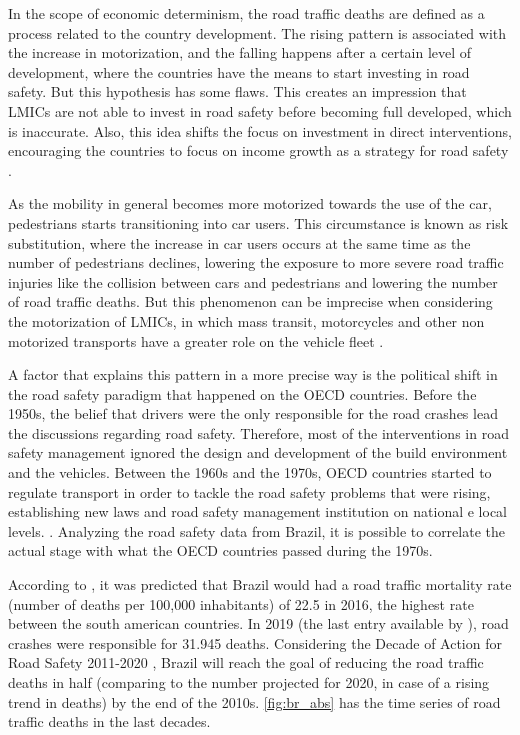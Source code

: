 In the scope of economic determinism, the road traffic deaths are defined as a process related to the country development. The rising pattern is associated with the increase in motorization, and the falling happens after a certain level of development, where the countries have the means to start investing in road safety. But this hypothesis has some flaws. This creates an impression that LMICs are not able to invest in road safety before becoming full developed, which is inaccurate. Also, this idea shifts the focus on investment in direct interventions, encouraging the countries to focus on income growth as a strategy for road safety \cite{Bhalla2016}.

As the mobility in general becomes more motorized towards the use of the car, pedestrians starts transitioning into car users. This circumstance is known as risk substitution, where the increase in car users occurs at the same time as the number of pedestrians declines, lowering the exposure to more severe road traffic injuries like the collision between cars and pedestrians and lowering the number of road traffic deaths. But this phenomenon can be imprecise when considering the motorization of LMICs, in which mass transit, motorcycles and other non motorized transports have a greater role on the vehicle fleet \cite{Bhalla2016}.   

A factor that explains this pattern in a more precise way is the political shift in the road safety paradigm that happened on the OECD countries. Before the 1950s, the belief that drivers were the only responsible for the road crashes lead the discussions regarding road safety. Therefore, most of the interventions in road safety management ignored the design and development of the build environment and the vehicles. Between the 1960s and the 1970s, OECD countries started to regulate transport in order to tackle the road safety problems that were rising, establishing new laws and road safety management institution on national e local levels. \cite{Bhalla2016}. Analyzing the road safety data from Brazil, it is possible to correlate the actual stage with what the OECD countries passed during the 1970s.

According to \textcite{WHO2018}, it was predicted that Brazil would had a road traffic mortality rate (number of deaths per 100,000 inhabitants) of 22.5 in 2016, the highest rate between the south american countries. In 2019 (the last entry available by \textcite{MinistryofHealth2020}), road crashes were responsible for 31.945 deaths. Considering the Decade of Action for Road Safety 2011-2020 \cite{WHO2011}, Brazil will reach the goal of reducing the road traffic deaths in half (comparing to the number projected for 2020, in case of a rising trend in deaths) by the end of the 2010s. \autoref{fig:br_abs} has the time series of road traffic deaths in the last decades.  

